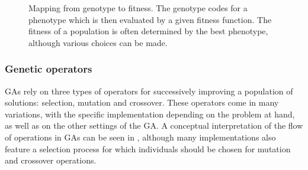\documentclass[a4paper,12pt]{article}
\theoremstyle{plain}
\theoremstyle{definition}
\begin{document}
\begin{figure}[H]
         \caption{Mapping from genotype to fitness. The genotype codes for a
         phenotype which is then evaluated by a given fitness function. The
         fitness of a population is often determined by the best phenotype, although 
         various choices can be made.} 
         \label{fig:genotype_to_fitness}
      \end{figure}

      \subsubsection{Genetic operators}
         GAs rely on three types of operators for successively
         improving a population of solutions: selection, mutation and crossover.
         These operators come in many variations, with the specific
         implementation depending on the problem at hand, as well as on the
         other settings of the GA. A conceptual interpretation of the flow of 
         operations in GAs can be seen in
         , although many implementations also feature a
         selection process for which individuals
         should be chosen for mutation and crossover operations. 
         
\end{document}
